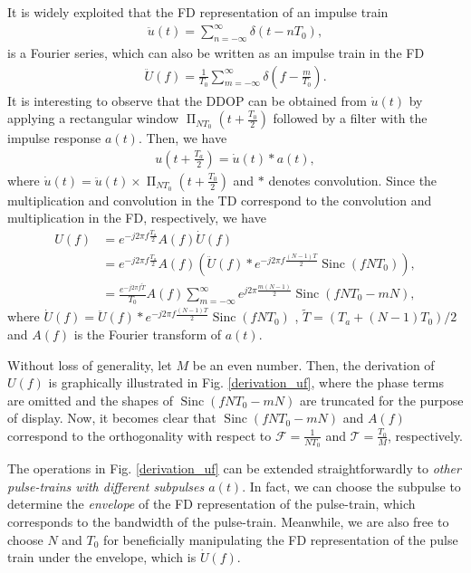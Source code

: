\documentclass[journal]{IEEEtran}
\DeclareMathOperator{\sinc}{Sinc}
\DeclareMathOperator{\rect}{\Pi}
\begin{document}
It is widely exploited that the FD representation of an impulse train
\begin{align}
  \ddot u(t)=\sum_{n=-\infty}^{\infty} \delta (t-nT_0),
\end{align}
is a Fourier series, which can also be written as an impulse train in the FD
\begin{align}
  \ddot U(f)=\frac{1}{T_0}\sum_{m=-\infty}^{\infty} \delta (f-\frac{m}{T_0}).
\end{align}
It is interesting to observe that the DDOP can be obtained from $\dot u(t)$ by applying a rectangular window $\rect_{NT_0}\left(t+\frac{T_0}{2}\right)$ followed by {a filter with the impulse response $a(t)$}. Then, we have
\begin{align}
  u\left(t+\frac{T_a}{2}\right)=\dot u(t)*a(t),
\end{align}
where $\dot u(t)= \ddot u(t)\times \rect_{NT_0}\left(t+\frac{T_0}{2}\right)$ and $*$ {denotes convolution}. Since the multiplication and convolution in the TD correspond to the convolution and multiplication in the FD, respectively, we have
\begin{align}
  U(f) & =e^{-j2\pi f \frac{T_a}{2}} A(f)\dot U(f) \nonumber                                                                          \\
       & =e^{-j2\pi f \frac{T_a}{2}} A(f) \left(\ddot U(f)* e^{-j2\pi f \frac{(N-1)T}{2}}\sinc(fNT_0)\right), \nonumber               \\
       & = \frac{e^{-j2\pi f \tilde T}}{T_0} A(f)  \sum_{m=-\infty}^{\infty} e^{j2\pi \frac{m(N-1)}{2}}\sinc(fNT_0-mN) , \label{ufeq}
\end{align}
where $\dot U(f)= \ddot U(f)* e^{-j2\pi f \frac{(N-1)T}{2}}\sinc(fNT_0)$ , $\tilde T= (T_a+(N-1)T_0)/2$ and $A(f)$ is the Fourier transform of $a(t)$.



Without loss of generality, let $M$ be an even number. Then, the derivation of  $U(f)$ {is graphically illustrated} in Fig. \ref{derivation_uf}, where the phase terms are omitted and the shapes of $\sinc(fNT_0-mN)$ are truncated for the purpose of display\cite{ddop,spcctalk}. Now, it becomes clear that $\sinc(fNT_0-mN)$ and  $A(f)$ correspond to the orthogonality with respect to $\mathcal F=\frac{1}{NT_0}$ and $\mathcal T= \frac{T_0}{M}$, respectively.


The operations in Fig. \ref{derivation_uf} can be extended straightforwardly to \emph{other pulse-trains with different subpulses $a(t)$}. In fact, we can choose the subpulse to determine the \emph{envelope} of the FD representation of the pulse-train, which corresponds to the {bandwidth of the pulse-train}. Meanwhile, we are also free to choose $N$ and $T_0$ for beneficially manipulating the FD representation of the pulse train under the envelope, which is $\dot U(f)$.
\end{document}

